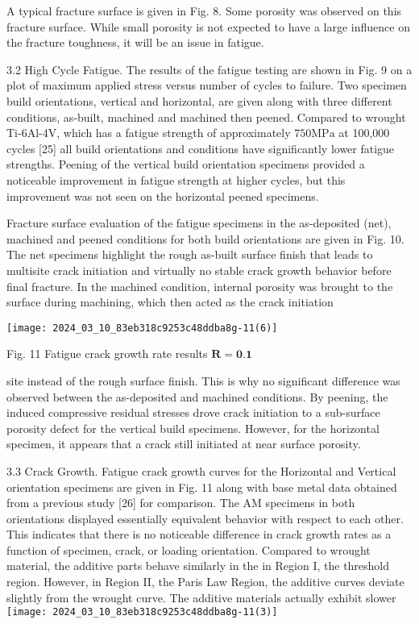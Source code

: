 \documentclass[10pt]{article}
\begin{document}
A typical fracture surface is given in Fig. 8. Some porosity was observed on this fracture surface. While small porosity is not expected to have a large influence on the fracture toughness, it will be an issue in fatigue.

3.2 High Cycle Fatigue. The results of the fatigue testing are shown in Fig. 9 on a plot of maximum applied stress versus number of cycles to failure. Two specimen build orientations, vertical and horizontal, are given along with three different conditions, as-built, machined and machined then peened. Compared to wrought Ti-6Al-4V, which has a fatigue strength of approximately $750 \mathrm{MPa}$ at 100,000 cycles [25] all build orientations and conditions have significantly lower fatigue strengths. Peening of the vertical build orientation specimens provided a noticeable improvement in fatigue strength at higher cycles, but this improvement was not seen on the horizontal peened specimens.

Fracture surface evaluation of the fatigue specimens in the as-deposited (net), machined and peened conditions for both build orientations are given in Fig. 10. The net specimens highlight the rough as-built surface finish that leads to multisite crack initiation and virtually no stable crack growth behavior before final fracture. In the machined condition, internal porosity was brought to the surface during machining, which then acted as the crack initiation

\begin{center}
\texttt{[image: 2024\_03\_10\_83eb318c9253c48ddba8g-11(6)]}
\end{center}

Fig. 11 Fatigue crack growth rate results $\boldsymbol{R}=\mathbf{0 . 1}$

site instead of the rough surface finish. This is why no significant difference was observed between the as-deposited and machined conditions. By peening, the induced compressive residual stresses drove crack initiation to a sub-surface porosity defect for the vertical build specimens. However, for the horizontal specimen, it appears that a crack still initiated at near surface porosity.

3.3 Crack Growth. Fatigue crack growth curves for the Horizontal and Vertical orientation specimens are given in Fig. 11 along with base metal data obtained from a previous study [26] for comparison. The AM specimens in both orientations displayed essentially equivalent behavior with respect to each other. This indicates that there is no noticeable difference in crack growth rates as a function of specimen, crack, or loading orientation. Compared to wrought material, the additive parts behave similarly in the in Region I, the threshold region. However, in Region II, the Paris Law Region, the additive curves deviate slightly from the wrought curve. The additive materials actually exhibit slower\\
\texttt{[image: 2024\_03\_10\_83eb318c9253c48ddba8g-11(3)]}
\end{document}
